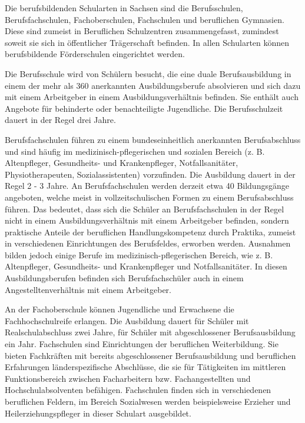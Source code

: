 Die berufsbildenden Schularten in Sachsen sind die Berufsschulen, Berufsfachschulen, Fachoberschulen, Fachschulen und beruflichen Gymnasien. Diese sind zumeist in Beruflichen Schulzentren zusammengefasst, zumindest soweit sie sich in öffentlicher Trägerschaft befinden. In allen Schularten können berufsbildende Förderschulen eingerichtet werden.

Die Berufsschule wird von Schülern besucht, die eine duale Berufsausbildung in einem der mehr als 360 anerkannten Ausbildungsberufe absolvieren und sich dazu mit einem Arbeitgeber in einem Ausbildungsverhältnis befinden. Sie enthält auch Angebote für behinderte oder benachteiligte Jugendliche. Die Berufsschulzeit dauert in der Regel drei Jahre. 

Berufsfachschulen führen zu einem bundeseinheitlich anerkannten Berufsabschluss und sind häufig im medizinisch-pflegerischen und sozialen Bereich (z. B. Altenpfleger, Gesundheits- und Krankenpfleger, Notfallsanitäter, Physiotherapeuten, Sozialassistenten) vorzufinden. Die Ausbildung dauert in der Regel 2 - 3 Jahre. An Berufsfachschulen werden derzeit etwa 40 Bildungsgänge angeboten, welche meist in vollzeitschulischen Formen zu einem Berufsabschluss führen. Das bedeutet, dass sich die Schüler an Berufsfachschulen in der Regel nicht in einem Ausbildungsverhältnis mit einem Arbeitgeber befinden, sondern praktische Anteile der beruflichen Handlungskompetenz durch Praktika, zumeist in verschiedenen Einrichtungen des Berufsfeldes, erworben werden. Ausnahmen bilden jedoch einige Berufe im medizinisch-pflegerischen Bereich, wie z. B. Altenpfleger, Gesundheits- und Krankenpfleger und Notfallsanitäter. In diesen Ausbildungsberufen befinden sich Berufsfachschüler auch in einem Angestelltenverhältnis mit einem Arbeitgeber.
 
An der Fachoberschule können Jugendliche und Erwachsene die Fachhochschulreife erlangen. Die Ausbildung dauert für Schüler mit Realschulabschluss zwei Jahre, für Schüler mit abgeschlossener Berufsausbildung ein Jahr. 
Fachschulen sind Einrichtungen der beruflichen Weiterbildung. Sie bieten Fachkräften mit bereits abgeschlossener Berufsausbildung und beruflichen Erfahrungen länderspezifische Abschlüsse, die sie für Tätigkeiten im mittleren Funktionsbereich zwischen Facharbeitern bzw. Fachangestellten und Hochschulabsolventen befähigen. Fachschulen finden sich in verschiedenen beruflichen Feldern, im Bereich Sozialwesen werden beispielsweise Erzieher und Heilerziehungspfleger in dieser Schulart ausgebildet. 

